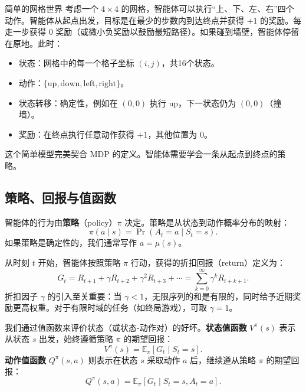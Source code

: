 \begin{example}{简单的网格世界}{}
    考虑一个 $4\times4$ 的网格，智能体可以执行“上、下、左、右”四个动作。智能体从起点出发，目标是在最少的步数内到达终点并获得 $+1$ 的奖励。每走一步获得 $0$ 奖励（或微小负奖励以鼓励最短路径）。如果碰到墙壁，智能体停留在原地。此时：
    \begin{itemize}
    \item 状态：网格中的每一个格子坐标 $(i,j)$，共16个状态。
    \item 动作：$\{\text{up}, \text{down}, \text{left}, \text{right}\}$。
    \item 状态转移：确定性，例如在 $(0,0)$ 执行 up，下一状态仍为 $(0,0)$（撞墙）。
    \item 奖励：在终点执行任意动作获得 $+1$，其他位置为 $0$。
    \end{itemize}
    这个简单模型完美契合 MDP 的定义。智能体需要学会一条从起点到终点的策略。
\end{example}

\subsection{策略、回报与值函数}

智能体的行为由\textbf{策略}（policy）$\pi$ 决定。策略是从状态到动作概率分布的映射：
\begin{equation}
\pi(a \mid s) = \Pr(A_t = a \mid S_t = s).
\end{equation}
如果策略是确定性的，我们通常写作 $a = \mu(s)$。

从时刻 $t$ 开始，智能体按照策略 $\pi$ 行动，获得的折扣回报（return）定义为：
\begin{equation}\label{eq:return}
G_t = R_{t+1} + \gamma R_{t+2} + \gamma^2 R_{t+3} + \cdots = \sum_{k=0}^{\infty} \gamma^k R_{t+k+1}.
\end{equation}
折扣因子 $\gamma$ 的引入至关重要：当 $\gamma<1$，无限序列的和是有限的，同时给予近期奖励更高权重。对于有限时域的任务（如终局游戏），可取 $\gamma=1$。

我们通过值函数来评价状态（或状态-动作对）的好坏。\textbf{状态值函数} $V^\pi(s)$ 表示从状态 $s$ 出发，始终遵循策略 $\pi$ 的期望回报：
\begin{equation}\label{eq:v}
V^\pi(s) = \mathbb{E}_{\pi}\left[ G_t \mid S_t = s \right].
\end{equation}
\textbf{动作值函数} $Q^\pi(s,a)$ 则表示在状态 $s$ 采取动作 $a$ 后，继续遵从策略 $\pi$ 的期望回报：
\begin{equation}\label{eq:q}
Q^\pi(s,a) = \mathbb{E}_{\pi}\left[ G_t \mid S_t = s, A_t = a \right].
\end{equation}

